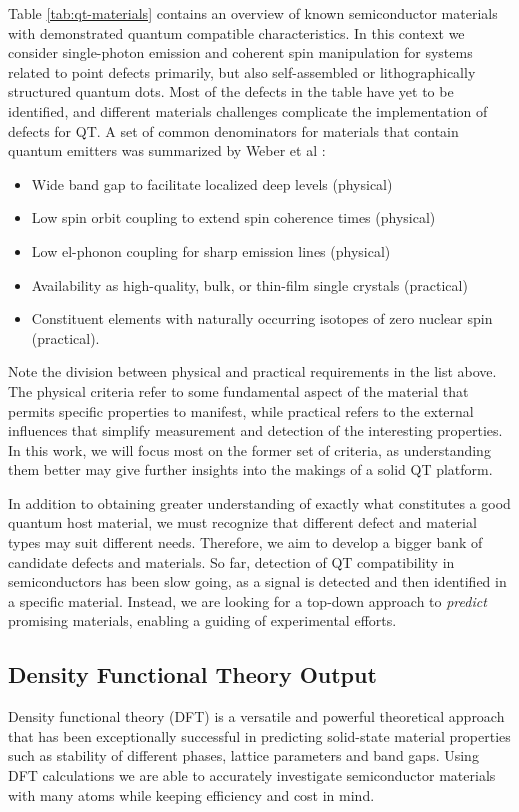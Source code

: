 \documentclass[superscriptaddress,unsortedaddress,
 amsmath,amssymb,
 aps,
]{revtex4-2}
\begin{document}
Table \ref{tab:qt-materials} contains an overview of known semiconductor materials with demonstrated quantum compatible characteristics. In this context we consider single-photon emission and coherent spin manipulation for systems related to point defects primarily, but also self-assembled or lithographically structured quantum dots. 
Most of the defects in the table have yet to be identified, and different materials challenges complicate the implementation of defects for QT. 
A set of common denominators for materials that contain quantum emitters was summarized by Weber et al \cite{Weber2010}: 
\begin{itemize}
    \item Wide band gap to facilitate localized deep levels (physical)
    \item Low spin orbit coupling to extend spin coherence times (physical) 
    \item Low el-phonon coupling for sharp emission lines (physical) 
    \item Availability as high-quality, bulk, or thin-film single crystals (practical)
    \item Constituent elements with naturally occurring isotopes of zero nuclear spin (practical). 
\end{itemize}
Note the division between physical and practical requirements in the list above. 
The physical criteria refer to some fundamental aspect of the material that permits specific properties to manifest, while practical refers to the external influences that simplify measurement and detection of the interesting properties. 
In this work, we will focus most on the former set of criteria, as understanding them better may give further insights into the makings of a solid QT platform. 

In addition to obtaining greater understanding of  exactly what constitutes a good quantum host material, we must recognize that different defect and material types may suit different needs. Therefore, we aim to develop a bigger bank of candidate defects and materials. 
So far, detection of QT compatibility in semiconductors has been slow going, as a signal is detected and then identified in a specific material.  
Instead, we are looking for a top-down approach to  \textit{predict} promising materials, enabling a guiding of experimental efforts. 

\subsection*{Density Functional Theory Output} %
Density functional theory (DFT) is a versatile and powerful theoretical approach that has been exceptionally successful in predicting solid-state material properties such as stability of different phases, lattice parameters and band gaps. 
Using DFT calculations we are able to accurately investigate semiconductor materials with many atoms while keeping efficiency and cost in mind.  
\end{document}
